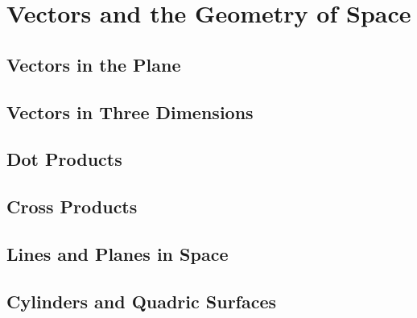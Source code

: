 \documentclass[../calc3.tex]{subfiles}
\begin{document}
\chapter{Vectors and the Geometry of Space}
\section{Vectors in the Plane}
\section{Vectors in Three Dimensions}
\section{Dot Products}
\section{Cross Products}
\section{Lines and Planes in Space}
\section{Cylinders and Quadric Surfaces}
\end{document}
